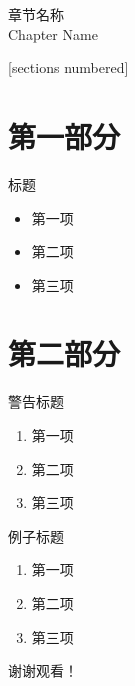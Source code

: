 \documentclass{styles/cuzbeamer}
\begin{document}
    
    \maketitle

    \begin{standout}[第X章]
        章节名称\\
        Chapter Name
    \end{standout}

    \begin{frame}
        [sections numbered]
        \tableofcontents
    \end{frame}

    \section{第一部分}

    \begin{frame}
        \begin{block}{标题}
            \begin{itemize}
                \item 第一项
                \item 第二项
                \item 第三项
            \end{itemize}
        \end{block}
    \end{frame}

    \section{第二部分}

    \begin{frame}
        \begin{alertblock}{警告标题}
            \begin{enumerate}
                \item 第一项
                \item 第二项
                \item 第三项
            \end{enumerate}
        \end{alertblock}
    \end{frame}

    \begin{frame}
        \begin{exampleblock}{例子标题}
            \begin{enumerate}
                \item 第一项
                \item 第二项
                \item 第三项
            \end{enumerate}
        \end{exampleblock}
    \end{frame}

    \begin{frame}[standout]
        谢谢观看！
    \end{frame}
\end{document}
